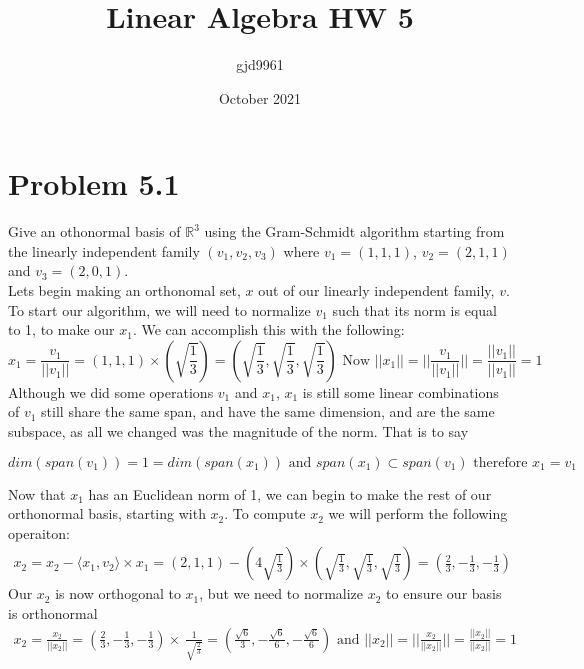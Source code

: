 \documentclass[12pt,twoside]{article}
\title{Linear Algebra HW 5}
\author{gjd9961 }
\date{October 2021}
\begin{document}
\maketitle

\section{Problem 5.1}
Give an othonormal basis of $\mathbb{R}^3$ using the Gram-Schmidt algorithm starting from the linearly independent family $(v_1, v_2, v_3)$ where $v_1 = (1, 1, 1)$, $v_2 = (2, 1, 1)$ and $v_3 = (2, 0, 1)$.
\\

Lets begin making an orthonomal set, $x$ out of our linearly independent family, $v$. To start our algorithm, we will need to normalize $v_1$ such that its norm is equal to 1, to make our $x_1$. We can accomplish this with the following: $$x_1 = \frac{v_1}{||v_1||} = (1,1,1) \times (\sqrt{\frac{1}{3}}) = (\sqrt{\frac{1}{3}},\sqrt{\frac{1}{3}},\sqrt{\frac{1}{3}}) \text{ Now }  ||x_1|| = ||\frac{v_1}{||v_1||}|| = \frac{||v_1||}{||v_1||} = 1$$ 
Although we did some operations $v_1$ and $x_1$, $x_1$ is still some linear combinations of $v_1$ still share the same span, and have the same dimension, and are the same subspace, as all we changed was the magnitude of the norm. That is to say 

$$dim(span(v_1)) = 1 = dim(span(x_1)) \text{ and } span(x_1) \subset span(v_1) \text{ therefore } x_1 = v_1$$

Now that $x_1$ has an Euclidean norm of 1, we can begin to make the rest of our orthonormal basis, starting with $x_2$. To compute $x_2$ we will perform the following operaiton:
\begin{equation}
    \begin{split}
        x_2 = x_2 - \langle x_1, v_2\rangle \times x_1 = (2,1,1)  - (4\sqrt{\frac{1}{3}}) \times  (\sqrt{\frac{1}{3}},\sqrt{\frac{1}{3}},\sqrt{\frac{1}{3}}) = (\frac{2}{3},-\frac{1}{3},-\frac{1}{3})
    \end{split}
\end{equation}
Our $x_2$ is now orthogonal to $x_1$, but we need to normalize $x_2$ to ensure our basis is orthonormal
\begin{equation}
    \begin{split}
        x_2 = \frac{x_2}{||x_2||} = (\frac{2}{3},-\frac{1}{3},-\frac{1}{3}) \times \
        \frac{1}{\sqrt{\frac{2}{3}}}   = (\frac{\sqrt{6}}{3},- \frac{\sqrt{6}}{6}, - \frac{\sqrt{6}}{6}) \text{ and } ||x_2|| = ||\frac{x_2}{||x_2||}|| = \frac{||x_2||}{||x_2||} = 1
    \end{split}
\end{equation}
\end{document}
